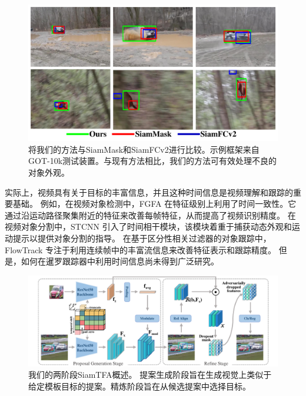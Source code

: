 \begin{figure}[t]
    \centering
    \includegraphics[width=1.0\textwidth]{Img/end/visulization.pdf}
    \caption{将我们的方法与SiamMask和SiamFCv2进行比较。示例框架来自GOT-10k测试装置。与现有方法相比，我们的方法可有效处理不良的对象外观。}
    \label{fig:visulization}
\end{figure}

实际上，视频具有关于目标的丰富信息，并且这种时间信息是视频理解和跟踪的重要基础。
例如，在视频对象检测中，FGFA \cite{zhu2017flow}在特征级别上利用了时间一致性。它通过沿运动路径聚集附近的特征来改善每帧特征，从而提高了视频识别精度。
在视频对象分割中，STCNN \cite{xu2019spatiotemporal}引入了时间相干模块，该模块着重于捕获动态外观和运动提示以提供对象分割的指导。
在基于区分性相关过滤器的对象跟踪中，FlowTrack \cite{zhu2018end} 专注于利用连续帧中的丰富流信息来改善特征表示和跟踪精度。
但是，如何在暹罗跟踪器中利用时间信息尚未得到广泛研究。

\begin{figure}[t]
    \centering
    \includegraphics[width=1.0\textwidth]{Img/end/net_v3.pdf}
    \caption{
    我们的两阶段SiamTFA概述。
    提案生成阶段旨在生成视觉上类似于给定模板目标的提案。精炼阶段旨在从候选提案中选择目标。}
    \label{fig:SiamTFA}
\end{figure}

